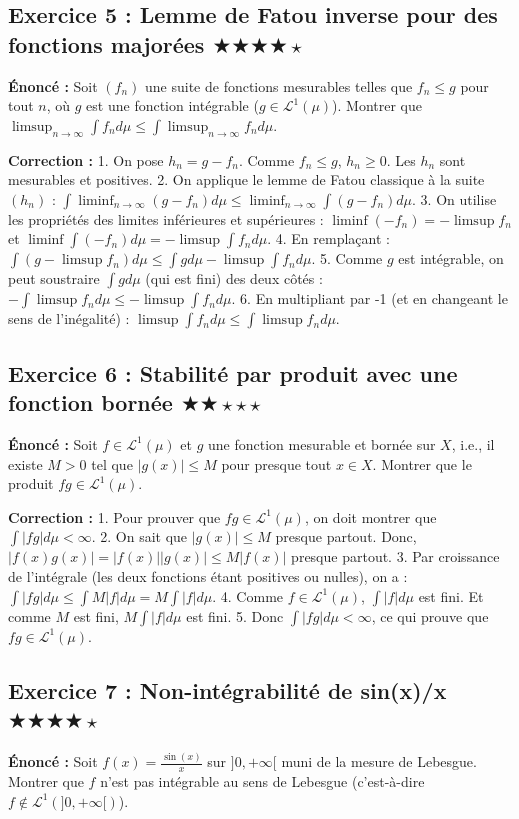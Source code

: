 \documentclass[11pt,a4paper]{article}
\begin{document}
\subsection*{Exercice 5 : Lemme de Fatou inverse pour des fonctions majorées \quad $\bigstar\bigstar\bigstar\bigstar\star$}
\textbf{Énoncé :}
Soit $(f_n)$ une suite de fonctions mesurables telles que $f_n \le g$ pour tout $n$, où $g$ est une fonction intégrable ($g \in \mathcal{L}^1(\mu)$).
Montrer que $\limsup_{n \to \infty} \int f_n d\mu \le \int \limsup_{n \to \infty} f_n d\mu$.

\textbf{Correction :}
1. On pose $h_n = g - f_n$. Comme $f_n \le g$, $h_n \ge 0$. Les $h_n$ sont mesurables et positives.
2. On applique le lemme de Fatou classique à la suite $(h_n)$ :
   $\int \liminf_{n \to \infty} (g - f_n) d\mu \le \liminf_{n \to \infty} \int (g - f_n) d\mu$.
3. On utilise les propriétés des limites inférieures et supérieures :
   $\liminf (-f_n) = - \limsup f_n$ et $\liminf \int (-f_n) d\mu = - \limsup \int f_n d\mu$.
4. En remplaçant :
   $\int (g - \limsup f_n) d\mu \le \int g d\mu - \limsup \int f_n d\mu$.
5. Comme $g$ est intégrable, on peut soustraire $\int g d\mu$ (qui est fini) des deux côtés :
   $-\int \limsup f_n d\mu \le - \limsup \int f_n d\mu$.
6. En multipliant par -1 (et en changeant le sens de l'inégalité) :
   $\limsup \int f_n d\mu \le \int \limsup f_n d\mu$.


\subsection*{Exercice 6 : Stabilité par produit avec une fonction bornée \quad $\bigstar\bigstar\star\star\star$}
\textbf{Énoncé :}
Soit $f \in \mathcal{L}^1(\mu)$ et $g$ une fonction mesurable et bornée sur $X$, i.e., il existe $M > 0$ tel que $|g(x)| \le M$ pour presque tout $x \in X$.
Montrer que le produit $fg \in \mathcal{L}^1(\mu)$.

\textbf{Correction :}
1. Pour prouver que $fg \in \mathcal{L}^1(\mu)$, on doit montrer que $\int |fg| d\mu < \infty$.
2. On sait que $|g(x)| \le M$ presque partout. Donc, $|f(x)g(x)| = |f(x)||g(x)| \le M|f(x)|$ presque partout.
3. Par croissance de l'intégrale (les deux fonctions étant positives ou nulles), on a :
   $\int |fg| d\mu \le \int M|f| d\mu = M \int |f| d\mu$.
4. Comme $f \in \mathcal{L}^1(\mu)$, $\int |f| d\mu$ est fini. Et comme $M$ est fini, $M \int |f| d\mu$ est fini.
5. Donc $\int |fg| d\mu < \infty$, ce qui prouve que $fg \in \mathcal{L}^1(\mu)$.


\subsection*{Exercice 7 : Non-intégrabilité de sin(x)/x \quad $\bigstar\bigstar\bigstar\bigstar\star$}
\textbf{Énoncé :}
Soit $f(x) = \frac{\sin(x)}{x}$ sur $]0, +\infty[$ muni de la mesure de Lebesgue.
Montrer que $f$ n'est pas intégrable au sens de Lebesgue (c'est-à-dire $f \notin \mathcal{L}^1(]0, +\infty[)$).
\end{document}
